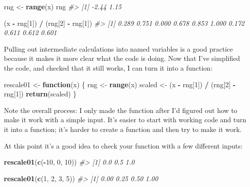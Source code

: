 \documentclass[]{book}
\newenvironment{Shaded}{\begin{snugshade}}{\end{snugshade}}
\newcommand{\KeywordTok}[1]{\textcolor[rgb]{0.13,0.29,0.53}{\textbf{#1}}}
\newcommand{\DecValTok}[1]{\textcolor[rgb]{0.00,0.00,0.81}{#1}}
\newcommand{\StringTok}[1]{\textcolor[rgb]{0.31,0.60,0.02}{#1}}
\newcommand{\CommentTok}[1]{\textcolor[rgb]{0.56,0.35,0.01}{\textit{#1}}}
\newcommand{\ControlFlowTok}[1]{\textcolor[rgb]{0.13,0.29,0.53}{\textbf{#1}}}
\newcommand{\OperatorTok}[1]{\textcolor[rgb]{0.81,0.36,0.00}{\textbf{#1}}}
\newcommand{\NormalTok}[1]{#1}
\begin{document}
\begin{Shaded}
\begin{Highlighting}[]
\NormalTok{rng <-}\StringTok{ }\KeywordTok{range}\NormalTok{(x)}
\NormalTok{rng}
\CommentTok{#> [1] -2.44  1.15}

\NormalTok{(x }\OperatorTok{-}\StringTok{ }\NormalTok{rng[}\DecValTok{1}\NormalTok{]) }\OperatorTok{/}\StringTok{ }\NormalTok{(rng[}\DecValTok{2}\NormalTok{] }\OperatorTok{-}\StringTok{ }\NormalTok{rng[}\DecValTok{1}\NormalTok{])}
\CommentTok{#>  [1] 0.289 0.751 0.000 0.678 0.853 1.000 0.172 0.611 0.612 0.601}
\end{Highlighting}
\end{Shaded}

Pulling out intermediate calculations into named variables is a good
practice because it makes it more clear what the code is doing. Now that
I've simplified the code, and checked that it still works, I can turn it
into a function:

\begin{Shaded}
\begin{Highlighting}[]
\NormalTok{rescale01 <-}\StringTok{ }\ControlFlowTok{function}\NormalTok{(x) \{}
\NormalTok{  rng <-}\StringTok{ }\KeywordTok{range}\NormalTok{(x)}
\NormalTok{  scaled <-}\StringTok{ }\NormalTok{(x }\OperatorTok{-}\StringTok{ }\NormalTok{rng[}\DecValTok{1}\NormalTok{]) }\OperatorTok{/}\StringTok{ }\NormalTok{(rng[}\DecValTok{2}\NormalTok{] }\OperatorTok{-}\StringTok{ }\NormalTok{rng[}\DecValTok{1}\NormalTok{])}
  \KeywordTok{return}\NormalTok{(scaled)}
\NormalTok{\}}
\end{Highlighting}
\end{Shaded}

Note the overall process: I only made the function after I'd figured out
how to make it work with a simple input. It's easier to start with
working code and turn it into a function; it's harder to create a
function and then try to make it work.

At this point it's a good idea to check your function with a few
different inputs:

\begin{Shaded}
\begin{Highlighting}[]
\KeywordTok{rescale01}\NormalTok{(}\KeywordTok{c}\NormalTok{(}\OperatorTok{-}\DecValTok{10}\NormalTok{, }\DecValTok{0}\NormalTok{, }\DecValTok{10}\NormalTok{))}
\CommentTok{#> [1] 0.0 0.5 1.0}

\KeywordTok{rescale01}\NormalTok{(}\KeywordTok{c}\NormalTok{(}\DecValTok{1}\NormalTok{, }\DecValTok{2}\NormalTok{, }\DecValTok{3}\NormalTok{, }\DecValTok{5}\NormalTok{))}
\CommentTok{#> [1] 0.00 0.25 0.50 1.00}
\end{Highlighting}
\end{Shaded}
\end{document}
